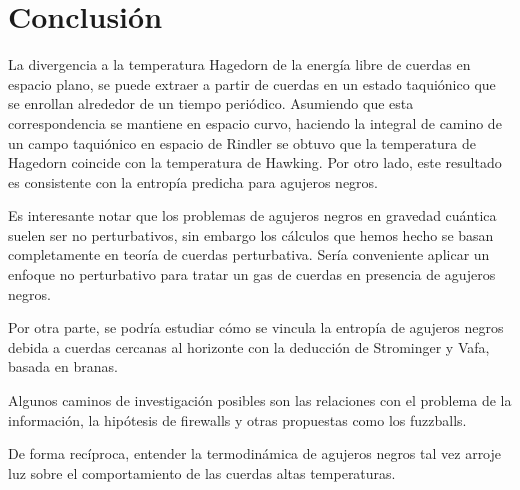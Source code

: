 \chapter{Conclusión}

La divergencia a la temperatura Hagedorn de la energía libre de cuerdas en espacio plano,
se puede extraer a partir de cuerdas en un estado taquiónico que se enrollan alrededor de
un tiempo periódico.
Asumiendo que esta correspondencia se mantiene en espacio curvo, haciendo la integral 
de camino de un campo taquiónico en espacio de Rindler se obtuvo que la temperatura de Hagedorn
coincide con la temperatura de Hawking.
Por otro lado, este resultado es consistente con la entropía predicha para agujeros negros.

Es interesante notar que los problemas de agujeros negros en gravedad cuántica suelen ser
no perturbativos, sin embargo los cálculos que hemos hecho se basan completamente en teoría de 
cuerdas perturbativa.
Sería conveniente aplicar un enfoque no perturbativo para tratar un gas de cuerdas en presencia de agujeros negros.

Por otra parte, se podría estudiar cómo se vincula la entropía de agujeros negros debida a cuerdas cercanas al horizonte con la deducción 
de Strominger y Vafa, basada en branas.

Algunos caminos de investigación posibles son las relaciones con el problema de la información, la hipótesis de firewalls y
otras propuestas como los fuzzballs.

De forma recíproca, entender la termodinámica de agujeros negros tal vez arroje luz sobre el 
comportamiento de las cuerdas altas temperaturas.

